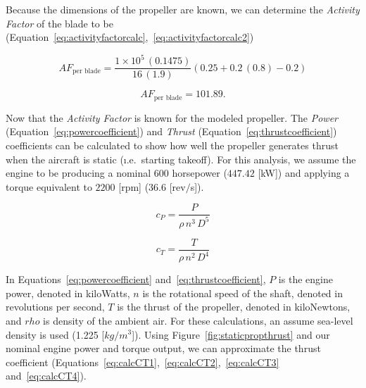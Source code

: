 \documentclass[12pt]{report}
\begin{document}
Because the dimensions of the propeller are known, we can determine the \textit{Activity Factor} of the blade to be (Equation~\ref{eq:activityfactorcalc},~\ref{eq:activityfactorcalc2})

\begin{equation}\label{eq:activityfactorcalc}
  AF_{\textrm{per blade}} = \frac{1 \times 10^5 \, (0.1475)}{16 \, (1.9)} \left(0.25 + 0.2 \, (0.8) - 0.2 \right)
\end{equation}

\begin{equation}\label{eq:activityfactorcalc2}
  AF_{\textrm{per blade}} = 101.89.
\end{equation}

Now that the \textit{Activity Factor} is known for the modeled propeller. The \textit{Power} (Equation~\ref{eq:powercoefficient}) and \textit{Thrust} (Equation~\ref{eq:thrustcoefficient}) coefficients can be calculated to show how well the propeller generates thrust when the aircraft is static (\i.e.\ starting takeoff). For this analysis, we assume the engine to be producing a nominal \(600\) horsepower (\(447.42\) [kW]) and applying a torque equivalent to \(2200\) [rpm] (\(36.6\) [rev\(/\)s]).

\begin{equation}\label{eq:powercoefficient}
  c_P = \frac{P}{\rho \, n^3 \, D^5}
\end{equation}

\begin{equation}\label{eq:thrustcoefficient}
  c_T = \frac{T}{\rho \, n^2 \, D^4}
\end{equation}

In Equations~\ref{eq:powercoefficient} and~\ref{eq:thrustcoefficient}, \(P\) is the engine power, denoted in kiloWatts, \(n\) is the rotational speed of the shaft, denoted in revolutions per second, \(T\) is the thrust of the propeller, denoted in kiloNewtons, and \( rho \) is density of the ambient air. For these calculations, an assume sea-level density is used (1.225 [\(kg/m^3\)]). Using Figure~\ref{fig:staticpropthrust} and our nominal engine power and torque output, we can approximate the thrust coefficient (Equations~\ref{eq:calcCT1},~\ref{eq:calcCT2},~\ref{eq:calcCT3} and~\ref{eq:calcCT4}).
\end{document}
